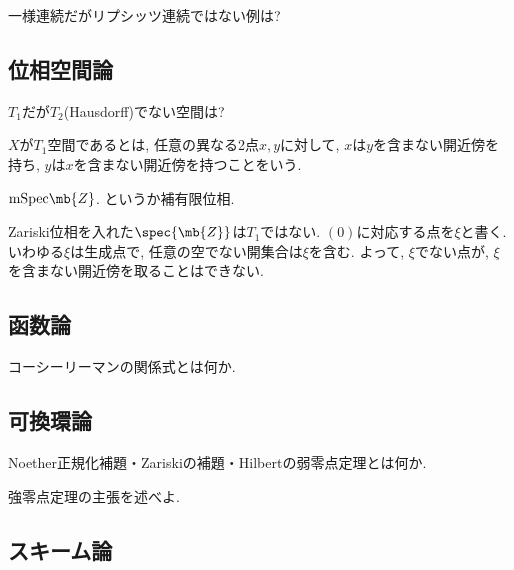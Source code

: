 \begin{prob}
一様連続だがリプシッツ連続ではない例は? 
\end{prob}


\subsection{位相空間論}

\begin{prob}
$T_1$だが$T_2$(Hausdorff)でない空間は? 
\end{prob}
\begin{recall}
$X$が$T_1$空間であるとは, 任意の異なる2点$x,y$に対して, $x$は$y$を含まない開近傍を持ち, $y$は$x$を含まない開近傍を持つことをいう. 
\end{recall}
\begin{ans}
$\mathrm{mSpec}\mb{Z}$. というか補有限位相. 
\end{ans}
\begin{miss}
Zariski位相を入れた$\spec{\mb{Z}}$は$T_1$ではない. $(0)$に対応する点を$\xi$と書く. いわゆる$\xi$は生成点で, 任意の空でない開集合は$\xi$を含む. よって, $\xi$でない点が, $\xi$を含まない開近傍を取ることはできない. 
\end{miss}


\subsection{函数論}

\begin{prob}
コーシーリーマンの関係式とは何か. 
\end{prob}




\subsection{可換環論}

\begin{prob}
Noether正規化補題・Zariskiの補題・Hilbertの弱零点定理とは何か. 
\end{prob}


\begin{prob}
強零点定理の主張を述べよ. 
\end{prob}

\begin{prob}

\end{prob}

\subsection{スキーム論}






